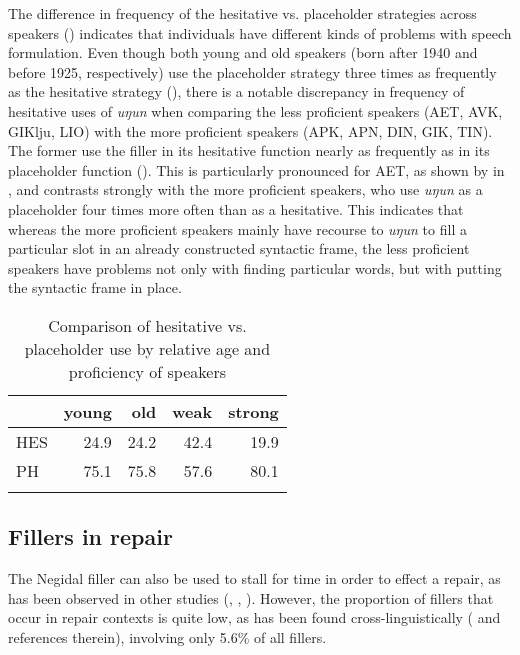 \documentclass[output=paper]{langscibook}
\begin{document}
The difference in frequency of the hesitative vs. placeholder strategies across speakers () indicates that individuals have different kinds of problems with speech formulation. Even though both young and old speakers (born after 1940 and before 1925, respectively) use the placeholder strategy three times as frequently as the hesitative strategy (), there is a notable discrepancy in frequency of hesitative uses of \textit{uŋun} when comparing the less proficient speakers (AET, AVK, GIKlju, LIO) with the more proficient speakers (APK, APN, DIN, GIK, TIN). The former use the filler in its hesitative function nearly as frequently as in its placeholder function (). This is particularly pronounced for AET, as shown by  in , and contrasts strongly with the more proficient speakers, who use \textit{uŋun} as a placeholder four times more often than as a hesitative. This indicates that whereas the more proficient speakers mainly have recourse to \textit{uŋun} to fill a particular slot in an already constructed syntactic frame, the less proficient speakers have problems not only with finding particular words, but with putting the syntactic frame in place. 

\begin{table}
\begin{tabular}{lrrrr}
\lsptoprule
 & {young} & {old} & {weak} & {strong}\\
\midrule
{HES} & 24.9 & 24.2 & 42.4 & 19.9\\
{PH} & 75.1 & 75.8 & 57.6 & 80.1\\
\lspbottomrule
\end{tabular}
\caption{Comparison of hesitative vs. placeholder use by relative age and proficiency of speakers}
\label{tab:pakendorf:2}
\end{table}

\subsection{Fillers in repair}
\label{sec:pakendorf:5.3}

The Negidal filler can also be used to stall for time in order to effect a repair, as has been observed in other studies (\citealt[87]{Tree2002}, \citealt[153]{LeSourd2003}, \citealt[103]{GanenkovGanenkov2010}). However, the proportion of fillers that occur in repair contexts is quite low, as has been found cross-linguistically (\citealt[463]{Lickley2015} and references therein), involving only 5.6\% of all fillers. 
\end{document}
